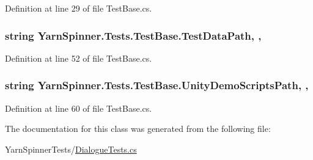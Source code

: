 Definition at line 29 of file Test\-Base.\-cs.

\hypertarget{a00164_aa9b4d902d61adad7165154a265f69aa4}{
\subsubsection[{Test\-Data\-Path}]{\setlength{\rightskip}{0pt plus 5cm}string Yarn\-Spinner.\-Tests.\-Test\-Base.\-Test\-Data\-Path\hspace{0.3cm}{\ttfamily [static]}, {\ttfamily [get]}, {\ttfamily [inherited]}}}\label{a00164_aa9b4d902d61adad7165154a265f69aa4}


Definition at line 52 of file Test\-Base.\-cs.

\hypertarget{a00164_a39922286f6255e4fd0e433a4fc7521c4}{
\subsubsection[{Unity\-Demo\-Scripts\-Path}]{\setlength{\rightskip}{0pt plus 5cm}string Yarn\-Spinner.\-Tests.\-Test\-Base.\-Unity\-Demo\-Scripts\-Path\hspace{0.3cm}{\ttfamily [static]}, {\ttfamily [get]}, {\ttfamily [inherited]}}}\label{a00164_a39922286f6255e4fd0e433a4fc7521c4}


Definition at line 60 of file Test\-Base.\-cs.



The documentation for this class was generated from the following file\-:\begin{DoxyCompactItemize}
\item 
Yarn\-Spinner\-Tests/\hyperlink{a00316}{Dialogue\-Tests.\-cs}\end{DoxyCompactItemize}

